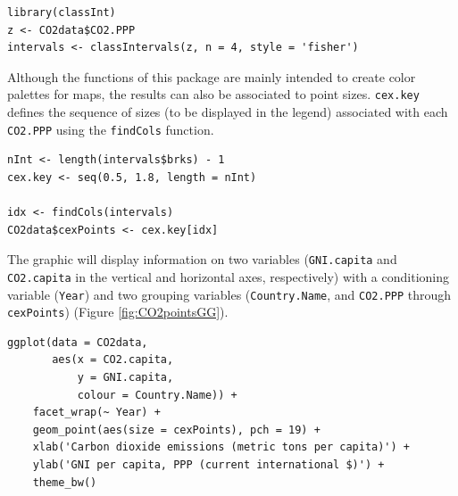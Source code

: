 \documentclass[smallroyalvopaper]{memoir}
\begin{document}
\lstset{language=r,label= ,caption= ,captionpos=b,numbers=none}
\begin{lstlisting}
library(classInt)
z <- CO2data$CO2.PPP
intervals <- classIntervals(z, n = 4, style = 'fisher')
\end{lstlisting}

Although the functions of this package are mainly intended to create color palettes for maps, the results can also be associated to point sizes. \texttt{cex.key} defines the sequence of sizes (to be displayed in the legend) associated with each \texttt{CO2.PPP} using the \texttt{findCols} function.
\lstset{language=r,label= ,caption= ,captionpos=b,numbers=none}
\begin{lstlisting}
nInt <- length(intervals$brks) - 1
cex.key <- seq(0.5, 1.8, length = nInt)

idx <- findCols(intervals)
CO2data$cexPoints <- cex.key[idx]
\end{lstlisting}

The graphic will display information on two variables (\texttt{GNI.capita} and \texttt{CO2.capita} in the vertical and horizontal axes, respectively) with a conditioning variable (\texttt{Year}) and two grouping variables (\texttt{Country.Name}, and \texttt{CO2.PPP} through \texttt{cexPoints}) (Figure \ref{fig:CO2pointsGG}).

\lstset{language=r,label= ,caption= ,captionpos=b,numbers=none}
\begin{lstlisting}
ggplot(data = CO2data,
       aes(x = CO2.capita,
           y = GNI.capita,
           colour = Country.Name)) +
    facet_wrap(~ Year) +
    geom_point(aes(size = cexPoints), pch = 19) +
    xlab('Carbon dioxide emissions (metric tons per capita)') +
    ylab('GNI per capita, PPP (current international $)') +
    theme_bw()
\end{lstlisting}
\end{document}
